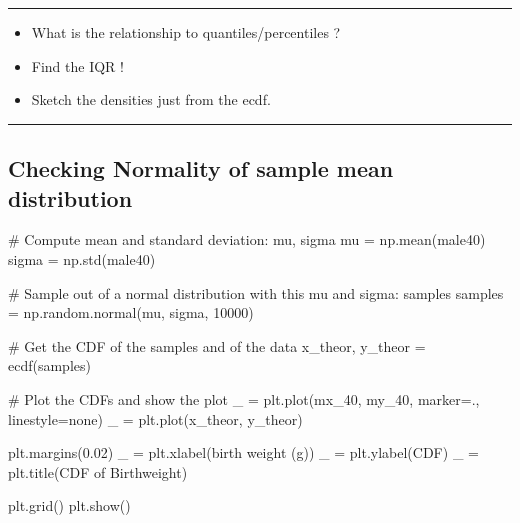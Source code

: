 \documentclass[
  letterpaper,
  DIV=11,
  numbers=noendperiod]{scrreprt}
\newenvironment{Shaded}{\begin{snugshade}}{\end{snugshade}}
\newcommand{\CommentTok}[1]{\textcolor[rgb]{0.37,0.37,0.37}{#1}}
\newcommand{\DecValTok}[1]{\textcolor[rgb]{0.68,0.00,0.00}{#1}}
\newcommand{\FloatTok}[1]{\textcolor[rgb]{0.68,0.00,0.00}{#1}}
\newcommand{\NormalTok}[1]{\textcolor[rgb]{0.00,0.23,0.31}{#1}}
\newcommand{\OperatorTok}[1]{\textcolor[rgb]{0.37,0.37,0.37}{#1}}
\newcommand{\StringTok}[1]{\textcolor[rgb]{0.13,0.47,0.30}{#1}}
\providecommand{\tightlist}{%
  \setlength{\itemsep}{0pt}\setlength{\parskip}{0pt}}\usepackage{longtable,booktabs,array}
\begin{document}
\begin{center}\rule{0.5\linewidth}{0.5pt}\end{center}

\begin{itemize}
\tightlist
\item
  What is the relationship to quantiles/percentiles ?
\item
  Find the IQR !
\item
  Sketch the densities just from the ecdf.
\end{itemize}

\begin{center}\rule{0.5\linewidth}{0.5pt}\end{center}

\hypertarget{checking-normality-of-sample-mean-distribution}{%
\subsection{Checking Normality of sample mean
distribution}\label{checking-normality-of-sample-mean-distribution}}

\begin{Shaded}
\begin{Highlighting}[]
\CommentTok{\# Compute mean and standard deviation: mu, sigma}
\NormalTok{mu }\OperatorTok{=}\NormalTok{ np.mean(male40)}
\NormalTok{sigma }\OperatorTok{=}\NormalTok{ np.std(male40)}

\CommentTok{\# Sample out of a normal distribution with this mu and sigma: samples}
\NormalTok{samples }\OperatorTok{=}\NormalTok{ np.random.normal(mu, sigma, }\DecValTok{10000}\NormalTok{)}

\CommentTok{\# Get the CDF of the samples and of the data}
\NormalTok{x\_theor, y\_theor }\OperatorTok{=}\NormalTok{ ecdf(samples)}

\CommentTok{\# Plot the CDFs and show the plot}
\NormalTok{\_ }\OperatorTok{=}\NormalTok{ plt.plot(mx\_40, my\_40, marker}\OperatorTok{=}\StringTok{\textquotesingle{}.\textquotesingle{}}\NormalTok{, linestyle}\OperatorTok{=}\StringTok{\textquotesingle{}none\textquotesingle{}}\NormalTok{)}
\NormalTok{\_ }\OperatorTok{=}\NormalTok{ plt.plot(x\_theor, y\_theor)}

\NormalTok{plt.margins(}\FloatTok{0.02}\NormalTok{)}
\NormalTok{\_ }\OperatorTok{=}\NormalTok{ plt.xlabel(}\StringTok{\textquotesingle{}birth weight (g)\textquotesingle{}}\NormalTok{)}
\NormalTok{\_ }\OperatorTok{=}\NormalTok{ plt.ylabel(}\StringTok{\textquotesingle{}CDF\textquotesingle{}}\NormalTok{)}
\NormalTok{\_ }\OperatorTok{=}\NormalTok{ plt.title(}\StringTok{\textquotesingle{}CDF of Birthweight\textquotesingle{}}\NormalTok{)}

\NormalTok{plt.grid()}
\NormalTok{plt.show()}
\end{Highlighting}
\end{Shaded}
\end{document}

